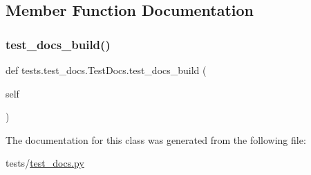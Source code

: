 \subsection{Member Function Documentation}
\mbox{\label{classtests_1_1test__docs_1_1TestDocs_ad8142c9573a84626d58a8d26cf2ac695}} 
\subsubsection{\texorpdfstring{test\+\_\+docs\+\_\+build()}{test\_docs\_build()}}
{\footnotesize\ttfamily def tests.\+test\+\_\+docs.\+Test\+Docs.\+test\+\_\+docs\+\_\+build (\begin{DoxyParamCaption}\item[{}]{self }\end{DoxyParamCaption})}



The documentation for this class was generated from the following file\+:\begin{DoxyCompactItemize}
\item 
tests/\hyperlink{test__docs_8py}{test\+\_\+docs.\+py}\end{DoxyCompactItemize}
